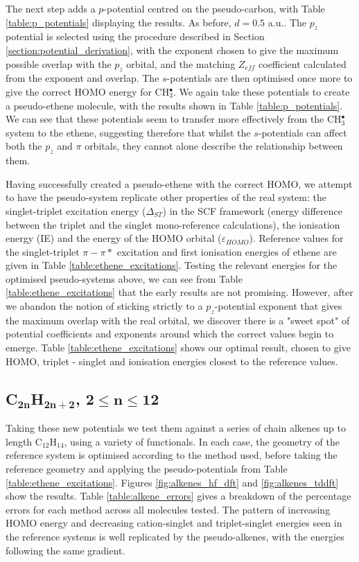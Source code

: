 \documentclass[12pt]{article}
\begin{document}
The next step adds a \(p\)-potential centred on the pseudo-carbon, with Table \ref{table:p_potentials} displaying the results. As before, \(d = 0.5\) a.u.. The \(p_{z}\) potential is selected using the procedure described in Section \ref{section:potential_derivation}, with the exponent chosen to give the maximum possible overlap with the \(p_{z}\) orbital, and the matching \(Z_{eff}\) coefficient calculated from the exponent and overlap. The \(s\)-potentials are then optimised once more to give the correct HOMO energy for CH\(^{\bullet}_{3}\). We again take these potentials to create a pseudo-ethene molecule, with the results shown in Table \ref{table:p_potentials}. We can see that these potentials seem to transfer more effectively from the CH\(^{\bullet}_{3}\) system to the ethene, suggesting therefore that whilst the \(s\)-potentials can affect both the \(p_{z}\) and \(\pi\) orbitals, they 
cannot alone describe the relationship between them.

Having successfully created a pseudo-ethene with the correct HOMO, we attempt to have the pseudo-system replicate other properties of the real system:
the singlet-triplet excitation energy ($\Delta_{ST}$) in the SCF framework (energy difference between the triplet and the singlet mono-reference
calculations), the ionisation energy (IE) and the energy of the HOMO orbital ($\varepsilon_{HOMO}$). Reference values for the singlet-triplet \(\pi-\pi*\) excitation and first ionisation energies of ethene are given in Table \ref{table:ethene_excitations}. Testing the relevant energies for the optimised pseudo-systems above, we can see from Table \ref{table:ethene_excitations} that the early results are not promising. However, after we abandon the notion of sticking strictly to a \(p_{z}\)-potential exponent that gives the maximum overlap with the real orbital, we discover there is a "sweet spot" of potential coefficients and exponents around which the correct values begin to emerge. Table \ref{table:ethene_excitations} shows our optimal result, chosen to give HOMO, triplet - singlet and ionisation energies closest to the reference values. 

\subsection*{\sffamily \large C\(\mathbf{_{2n}}\)H\(\mathbf{_{2n+2}}\), \(\mathbf{2 \leq n \leq 12}\)}

Taking these new potentials we test them against a series of chain alkenes up to length C\(_{12}\)H\(_{14}\), using a variety of functionals. In each case, the geometry of the reference system is optimised according to the method used, 
before taking the reference geometry and applying the pseudo-potentials from Table \ref{table:ethene_excitations}. 
Figures \ref{fig:alkenes_hf_dft} and \ref{fig:alkenes_tddft} show the results. Table \ref{table:alkene_errors} gives a breakdown of the percentage errors for each method across all molecules tested. The pattern of increasing HOMO energy and decreasing cation-singlet and triplet-singlet energies seen in the reference systems is well replicated by the pseudo-alkenes, with the energies following the same gradient.
\end{document}

